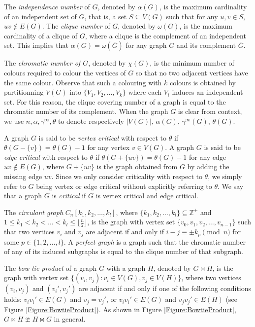 \documentclass[11pt]{article}
\begin{document}
The \emph{independence number} of $G$, denoted by $\alpha(G)$, is the maximum cardinality of an independent set of $G$, that is, a set $S \subseteq V(G)$ such that for any $u, v \in S$, $uv \not\in E(G)$. The \emph{clique number} of $G$, denoted by $\omega(G)$, is the maximum cardinality of a clique of $G$, where a clique is the complement of an independent set. This implies that $\alpha(G)=\omega(\overline{G})$ for any graph $G$ and its complement $\overline{G}$.

The \emph{chromatic number of $G$}, denoted by $\chi(G)$, is the minimum number of colours required to colour the vertices of $G$ so that no two adjacent vertices have the same colour. Observe that such a colouring with $k$ colours is obtained by partitionning $V(G)$ into $\{V_1, V_2, \ldots, V_k\}$ where each $V_i$ induces an independent set. For this reason, the clique covering number of a graph is equal to the chromatic number of its complement.	When the graph $G$ is clear from context, we use $n, \alpha, \gamma^\infty, \theta$ to denote respectively $|V(G)|$, $\alpha(G)$, $\gamma^\infty(G)$, $\theta(G)$.

A graph $G$ is said to be \emph{vertex critical} with respect to $\theta$ if $\theta(G-\{v\})=\theta(G)-1$ for any vertex $v \in V(G)$. A graph $G$ is said to be \emph{edge critical} with respect to $\theta$ if $\theta(G+\{uv\})=\theta(G)-1$ for any edge $uv \not\in E(G)$, where $G+\{uv\}$ is the graph obtained from $G$ by adding the missing edge $uv$. Since we only consider criticality with respect to $\theta$, we simply refer to $G$ being vertex or edge critical without explicitly referring to $\theta$. We say that a graph $G$ is \textit{critical} if $G$ is vertex critical and edge critical.

The \emph{circulant graph} $C_n[k_1, k_2, \ldots, k_l]$, where $\{k_1, k_2, \ldots, k_l\} \subseteq \mathbb{Z}^+$ and $1 \leq k_1 < k_2 < \ldots < k_l \leq \lfloor \frac{n}{2} \rfloor$, is the graph with vertex set $\{v_0, v_1, v_2, \ldots, v_{n-1}\}$ such that two vertices $v_i$ and $v_j$ are adjacent if and only if $i-j \equiv \pm k_p \pmod n$ for some $p \in \{1, 2, \ldots, l\}$. A \emph{perfect graph} is a graph such that the chromatic number of any of its induced subgraphs is equal to the clique number of that subgraph.

The \emph{bow tie product} of a graph $G$ with a graph $H$, denoted by $G \bowtie H$, is the graph with vertex set $\{(v_i, v_j): v_i \in V(G), v_j \in V(H)\}$, where two vertices $(v_i, v_j)$ and $(v_i', v_j')$ are adjacent if and only if one of the following conditions holds: $v_i v_i' \in E(G)$ and $v_j = v_j'$, or $v_i v_i' \in E(G)$ and $v_j v_j' \in E(H)$ (see Figure \ref{Figure:BowtieProduct}). As shown in Figure \ref{Figure:BowtieProduct}, $G \bowtie H \ncong H \bowtie G$ in general.
	
\end{document}
